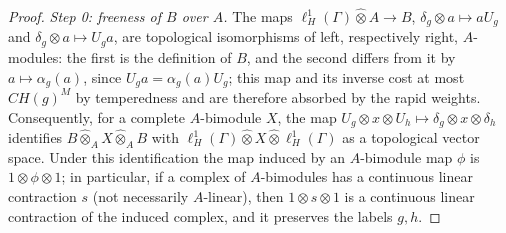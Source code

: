 \documentclass[11pt]{amsart}
\theoremstyle{definition}
\theoremstyle{remark}
\begin{document}
\begin{proof}
\emph{Step 0: freeness of $B$ over $A$.}  The maps
$\ell^{1}_{H}(\Gamma)\widehat\otimes A\to B$, $\delta_g\otimes a\mapsto
aU_g$ and $\delta_g\otimes a\mapsto U_ga$, are topological isomorphisms of
left, respectively right, $A$-modules: the first is the definition of $B$,
and the second differs from it by $a\mapsto\alpha_g(a)$, since
$U_ga=\alpha_g(a)U_g$; this map and its inverse cost at most $CH(g)^{M}$ by
temperedness and are therefore absorbed by the rapid weights.  Consequently,
for a complete $A$-bimodule $X$, the map $U_g\otimes x\otimes U_h\mapsto
\delta_g\otimes x\otimes\delta_h$ identifies
$B\widehat\otimes_AX\widehat\otimes_AB$ with $\ell^{1}_{H}(\Gamma)\widehat
\otimes X\widehat\otimes\ell^{1}_{H}(\Gamma)$ as a topological vector space.
Under this identification the map induced by an $A$-bimodule map $\phi$ is
$1\otimes\phi\otimes1$; in particular, if a complex of $A$-bimodules has a
continuous linear contraction $s$ (not necessarily $A$-linear), then
$1\otimes s\otimes1$ is a continuous linear contraction of the induced
complex, and it preserves the labels $g,h$.


\end{proof}
\end{document}
